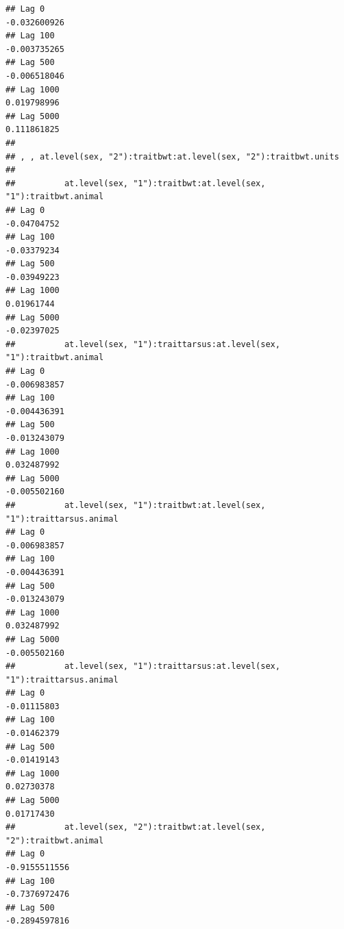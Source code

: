 \documentclass[
  12pt,
]{book}
\begin{document}
\begin{verbatim}
## Lag 0                                                           -0.032600926
## Lag 100                                                         -0.003735265
## Lag 500                                                         -0.006518046
## Lag 1000                                                         0.019798996
## Lag 5000                                                         0.111861825
## 
## , , at.level(sex, "2"):traitbwt:at.level(sex, "2"):traitbwt.units
## 
##          at.level(sex, "1"):traitbwt:at.level(sex, "1"):traitbwt.animal
## Lag 0                                                       -0.04704752
## Lag 100                                                     -0.03379234
## Lag 500                                                     -0.03949223
## Lag 1000                                                     0.01961744
## Lag 5000                                                    -0.02397025
##          at.level(sex, "1"):traittarsus:at.level(sex, "1"):traitbwt.animal
## Lag 0                                                         -0.006983857
## Lag 100                                                       -0.004436391
## Lag 500                                                       -0.013243079
## Lag 1000                                                       0.032487992
## Lag 5000                                                      -0.005502160
##          at.level(sex, "1"):traitbwt:at.level(sex, "1"):traittarsus.animal
## Lag 0                                                         -0.006983857
## Lag 100                                                       -0.004436391
## Lag 500                                                       -0.013243079
## Lag 1000                                                       0.032487992
## Lag 5000                                                      -0.005502160
##          at.level(sex, "1"):traittarsus:at.level(sex, "1"):traittarsus.animal
## Lag 0                                                             -0.01115803
## Lag 100                                                           -0.01462379
## Lag 500                                                           -0.01419143
## Lag 1000                                                           0.02730378
## Lag 5000                                                           0.01717430
##          at.level(sex, "2"):traitbwt:at.level(sex, "2"):traitbwt.animal
## Lag 0                                                     -0.9155511556
## Lag 100                                                   -0.7376972476
## Lag 500                                                   -0.2894597816

\end{verbatim}
\end{document}

